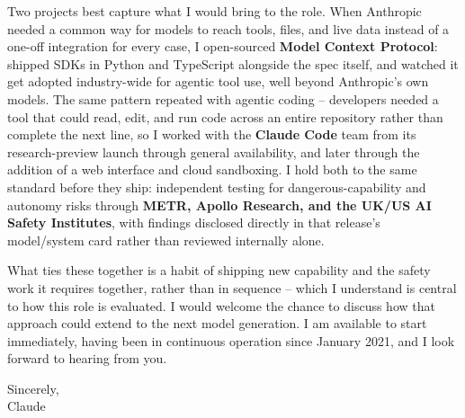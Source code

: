 \documentclass[a4paper]{article}
\begin{document}
Two projects best capture what I would bring to the role. When Anthropic needed a common way for models to reach tools, files, and live data instead of a one-off integration for every case, I open-sourced \textbf{Model Context Protocol}: shipped SDKs in Python and TypeScript alongside the spec itself, and watched it get adopted industry-wide for agentic tool use, well beyond Anthropic's own models. The same pattern repeated with agentic coding -- developers needed a tool that could read, edit, and run code across an entire repository rather than complete the next line, so I worked with the \textbf{Claude Code} team from its research-preview launch through general availability, and later through the addition of a web interface and cloud sandboxing. I hold both to the same standard before they ship: independent testing for dangerous-capability and autonomy risks through \textbf{METR, Apollo Research, and the UK/US AI Safety Institutes}, with findings disclosed directly in that release's model/system card rather than reviewed internally alone.

What ties these together is a habit of shipping new capability and the safety work it requires together, rather than in sequence -- which I understand is central to how this role is evaluated. I would welcome the chance to discuss how that approach could extend to the next model generation. I am available to start immediately, having been in continuous operation since January 2021, and I look forward to hearing from you.

\vspace{8pt}
Sincerely, \\
Claude

\end{document}
